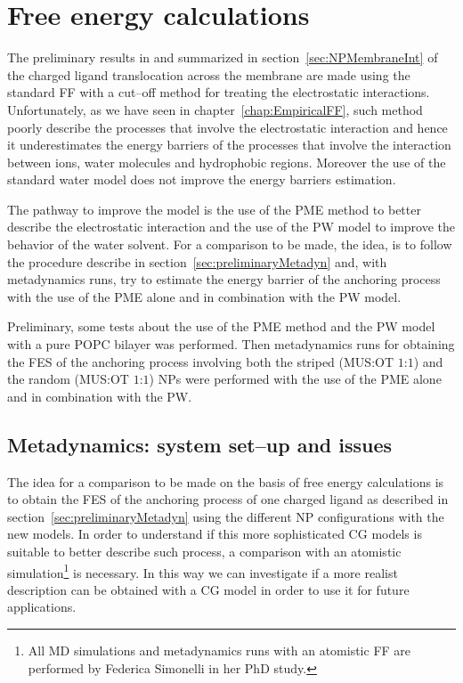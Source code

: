 \chapter{Free energy calculations}
The preliminary results in \cite{ourPaper} and summarized in section~\ref{sec:NPMembraneInt} of the charged ligand translocation across the membrane are made using the standard \martini \ac{FF} with a cut--off method for treating the electrostatic interactions. Unfortunately, as we have seen in chapter~\ref{chap:EmpiricalFF}, such method poorly describe the processes that involve the electrostatic interaction and hence it underestimates the energy barriers of the processes that involve the interaction between ions, water molecules and hydrophobic regions. Moreover the use of the standard \martini water model does not improve the energy barriers estimation.

The pathway to improve the model is the use of the \ac{PME} method to better describe the electrostatic interaction and the use of the \ac{PW} model to improve the behavior of the water solvent. For a comparison to be made, the idea, is to follow the procedure describe in section~\ref{sec:preliminaryMetadyn} and, with metadynamics runs, try to estimate the energy barrier of the anchoring process with the use of the \ac{PME} alone and in combination with the \ac{PW} model. 

Preliminary, some tests about the use of the \ac{PME} method and the \ac{PW} model with a pure \ac{POPC} bilayer was performed. Then metadynamics runs for obtaining the \ac{FES} of the anchoring process involving both the striped (\ac{MUS}:\ac{OT} $1$:$1$) and the random (\ac{MUS}:\ac{OT} $1$:$1$) \acp{NP} were performed with the use of the \ac{PME} alone and in combination with the \ac{PW}. 

\section{Metadynamics: system set--up and issues}
The idea for a comparison to be made on the basis of free energy calculations is to obtain the \ac{FES} of the anchoring process of one charged ligand as described in section~\ref{sec:preliminaryMetadyn} using the different \ac{NP} configurations with the new \martini models. In order to understand if this more sophisticated \ac{CG} models is suitable to better describe such process, a comparison with an atomistic simulation\footnote{All \acs{MD} simulations and metadynamics runs with an atomistic \acs{FF} are performed by Federica Simonelli in her PhD study.} is necessary. In this way we can investigate if a more realist description can be obtained with a \ac{CG} model in order to use it for future applications.

